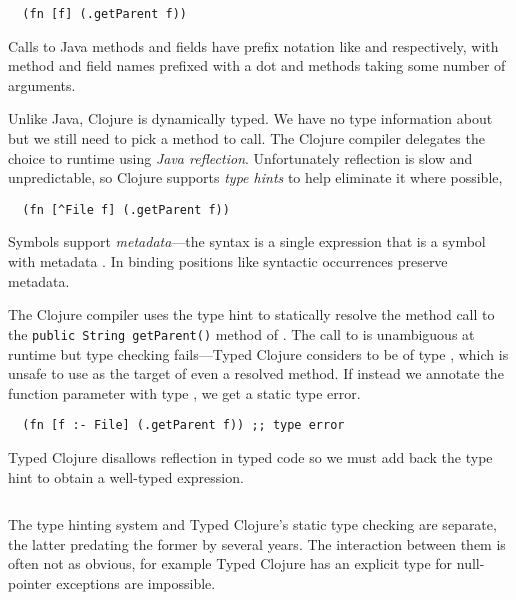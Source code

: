 \begin{verbatim}
  (fn [f] (.getParent f))
\end{verbatim}

Calls to Java methods and fields have prefix notation
like  and  respectively,
with method and field names prefixed with a dot and methods taking some number of arguments.

Unlike Java, Clojure is dynamically typed. We have no type information about 
but we still need to pick a method to call. The Clojure compiler delegates
the choice to runtime using \emph{Java reflection}.
Unfortunately reflection is slow and unpredictable, so Clojure supports \emph{type hints}
to help eliminate it where possible, 

\begin{verbatim}
  (fn [^File f] (.getParent f))
\end{verbatim}

Symbols support \emph{metadata}---the syntax 
is a single expression that is a symbol  with metadata .
In binding positions like 
syntactic occurrences preserve metadata.

The Clojure compiler uses the type hint
to statically resolve 
the method call to the
\texttt{public String getParent()}
method of .
The call to  is unambiguous at runtime but type 
checking fails---Typed Clojure
considers  to be of type , which is unsafe 
to use as the target of even a resolved method.
If instead we annotate the function parameter with type ,
we get a static type error.

\begin{verbatim}
  (fn [f :- File] (.getParent f)) ;; type error
\end{verbatim}

Typed Clojure disallows reflection in typed code
so we must add back the type hint to obtain a well-typed
expression.

\begin{exmp}
\inputminted[firstline=10,lastline=10]{clojure}{code/demo/src/demo/parent3.clj}
\end{exmp}


The type hinting system and Typed Clojure's static type checking
are separate, the latter predating the former by several years.
The interaction between them is often not as obvious, for example Typed Clojure
has an explicit type for 
null-pointer exceptions are impossible.


